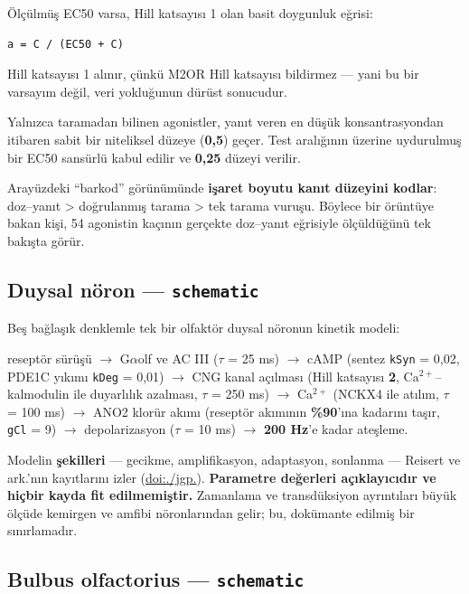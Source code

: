 \documentclass[11pt,a4paper]{article}
\begin{document}
Ölçülmüş EC50 varsa, Hill katsayısı 1 olan basit doygunluk eğrisi:


\begin{Verbatim}[fontsize=\small, xleftmargin=1em]
a = C / (EC50 + C)
\end{Verbatim}

Hill katsayısı 1 alınır, çünkü M2OR Hill katsayısı bildirmez — yani bu bir varsayım değil, veri yokluğunun dürüst sonucudur.

Yalnızca taramadan bilinen agonistler, yanıt veren en düşük konsantrasyondan itibaren sabit bir niteliksel düzeye (\textbf{0,5}) geçer. Test aralığının üzerine uydurulmuş bir EC50 sansürlü kabul edilir ve \textbf{0,25} düzeyi verilir.

Arayüzdeki ``barkod'' görünümünde \textbf{işaret boyutu kanıt düzeyini kodlar}: doz–yanıt > doğrulanmış tarama > tek tarama vuruşu. Böylece bir örüntüye bakan kişi, 54 agonistin kaçının gerçekte doz–yanıt eğrisiyle ölçüldüğünü tek bakışta görür.


\subsection{Duysal nöron — \texttt{\small schematic}}

Beş bağlaşık denklemle tek bir olfaktör duysal nöronun kinetik modeli:

reseptör sürüşü \(\rightarrow\) G\(\alpha\)olf ve AC III (\(\tau\) = 25 ms) \(\rightarrow\) cAMP (sentez \texttt{\small kSyn} = 0,02, PDE1C yıkımı \texttt{\small kDeg} = 0,01) \(\rightarrow\) CNG kanal açılması (Hill katsayısı \textbf{2}, Ca\(^{2+}\)–kalmodulin ile duyarlılık azalması, \(\tau\) = 250 ms) \(\rightarrow\) Ca\(^{2+}\) (NCKX4 ile atılım, \(\tau\) = 100 ms) \(\rightarrow\) ANO2 klorür akımı (reseptör akımının \textbf{\%90}'ına kadarını taşır, \texttt{\small gCl} = 9) \(\rightarrow\) depolarizasyon (\(\tau\) = 10 ms) \(\rightarrow\) \textbf{200 Hz}'e kadar ateşleme.

Modelin \textbf{şekilleri} — gecikme, amplifikasyon, adaptasyon, sonlanma — Reisert ve ark.'nın kayıtlarını izler (\href{https://doi.org/10.1085/jgp.201110645}{doi:./\allowbreak jgp.}). \textbf{Parametre değerleri açıklayıcıdır ve hiçbir kayda fit edilmemiştir.} Zamanlama ve transdüksiyon ayrıntıları büyük ölçüde kemirgen ve amfibi nöronlarından gelir; bu, dokümante edilmiş bir sınırlamadır.


\subsection{Bulbus olfactorius — \texttt{\small schematic}}
\end{document}
